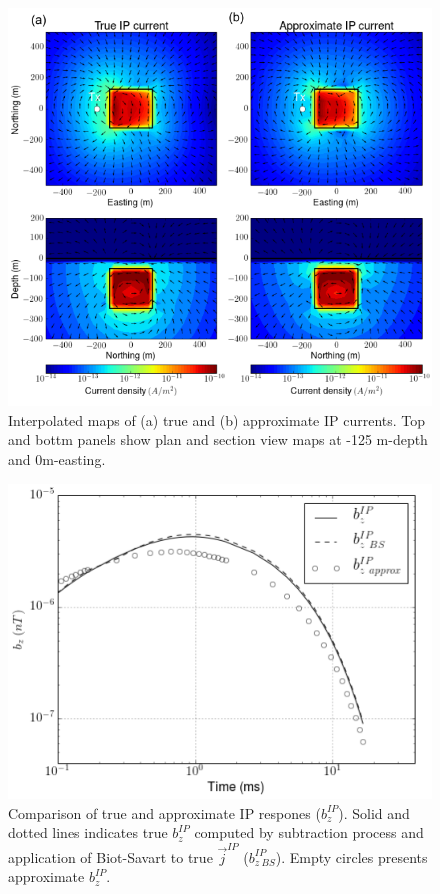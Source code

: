 \documentclass[a4paper, 11pt]{article}
\renewcommand {\j}  { {\vec j} }
\begin{document}
\begin{figure}[htb]
  \centering
  \includegraphics[width=1\textwidth]{figures/IPcurrent_PlanandSec_late.png}
  \caption{Interpolated maps of (a) true and (b) approximate IP currents. Top and bottm panels show plan and section view maps at -125 m-depth and 0m-easting. }
  \label{F:IPcurrent_PlanandSec_late}
\end{figure}

\begin{figure}[htb]
  \centering
  \includegraphics[width=1\textwidth]{figures/True_vs_approx_IPresp.png}
  \caption{Comparison of true and approximate IP respones ($b_z^{IP}$). Solid and dotted lines indicates true $b_z^{IP}$ computed by subtraction process and application of Biot-Savart to true $\j^{IP}$ ($b_{z \ BS}^{IP}$). Empty circles presents approximate $b_z^{IP}$. }
  \label{F:True_vs_approx_IPresp}
\end{figure}
\clearpage
\end{document}
